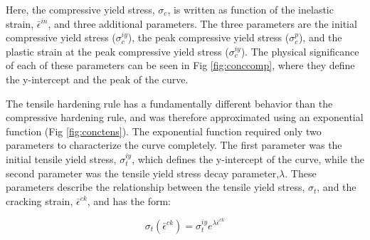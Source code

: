 Here, the compressive yield stress, $\sigma_{c}$, is written as function
of the inelastic strain, $\bar{\epsilon}^{in}$, and three additional
parameters. The three parameters are the initial compressive yield
stress ($\sigma_{c}^{iy}$), the peak compressive yield stress ($\sigma_{c}^{p}$),
and the plastic strain at the peak compressive yield stress ($\sigma_{c}^{iy}$).
The physical significance of each of these parameters can be seen
in Fig \ref{fig:conccomp}, where they define the y-intercept and the peak of the curve.

The tensile hardening rule has a fundamentally different behavior
than the compressive hardening rule, and was therefore approximated
using an exponential function (Fig \ref{fig:conctens}). The exponential function required
only two parameters to characterize the curve completely. The first
parameter was the initial tensile yield stress, $\sigma_{t}^{iy}$,
which defines the y-intercept of the curve, while the second parameter
was the tensile yield stress decay parameter,$\lambda$. These parameters
describe the relationship between the tensile yield stress, $\sigma_{t}$,
and the cracking strain, $\bar{\epsilon}^{ck}$, and has the form:

\begin{equation}
\sigma_{t}\left(\bar{\epsilon}^{ck}\right)=\sigma_{t}^{iy}e^{\lambda\bar{\epsilon}^{ck}}\label{eqn:param2}
\end{equation}


